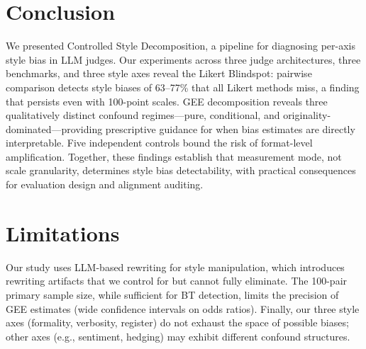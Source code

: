 \documentclass[11pt,twocolumn]{article}
\begin{document}
\section{Conclusion}
\label{sec:conclusion}

We presented Controlled Style Decomposition, a pipeline for diagnosing per-axis style bias in LLM judges. Our experiments across three judge architectures, three benchmarks, and three style axes reveal the Likert Blindspot: pairwise comparison detects style biases of 63--77\% that all Likert methods miss, a finding that persists even with 100-point scales. GEE decomposition reveals three qualitatively distinct confound regimes---pure, conditional, and originality-dominated---providing prescriptive guidance for when bias estimates are directly interpretable. Five independent controls bound the risk of format-level amplification. Together, these findings establish that measurement mode, not scale granularity, determines style bias detectability, with practical consequences for evaluation design and alignment auditing.

\section*{Limitations}

Our study uses LLM-based rewriting for style manipulation, which introduces rewriting artifacts that we control for but cannot fully eliminate. The 100-pair primary sample size, while sufficient for BT detection, limits the precision of GEE estimates (wide confidence intervals on odds ratios). Finally, our three style axes (formality, verbosity, register) do not exhaust the space of possible biases; other axes (e.g., sentiment, hedging) may exhibit different confound structures.
\end{document}
